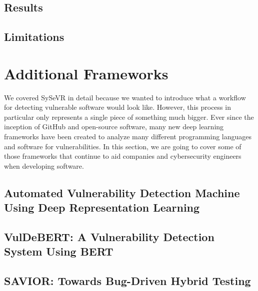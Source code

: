 \documentclass[12pt,twocolumn,letterpaper]{article}
\begin{document}
\subsection{Results}
\label{sub:results}

\subsection{Limitations}
\label{sub:limitations}

\section{Additional Frameworks}
\label{sec:additional-frameworks}

We covered SySeVR in detail because we wanted to introduce what a workflow for detecting vulnerable 
software would look like. However, this process in particular only represents a single piece of something 
much bigger. Ever since the inception of GitHub and open-source software, many new deep learning frameworks have been 
created to analyze many different programming languages and software for vulnerabilities. In this section, 
we are going to cover some of those frameworks that continue to aid companies and cybersecurity engineers 
when developing software.

\subsection{Automated Vulnerability Detection Machine Using Deep Representation Learning}
\label{sub:automated-vulnerability-detection-machine-using-deep-representation-learning}

\cite{Russell18}

\subsection{VulDeBERT: A Vulnerability Detection System Using BERT}
\label{sub:vuldebert}

\cite{Kim22}

\subsection{SAVIOR: Towards Bug-Driven Hybrid Testing}
\label{sub:savior}

\cite{Chen20}
\end{document}
